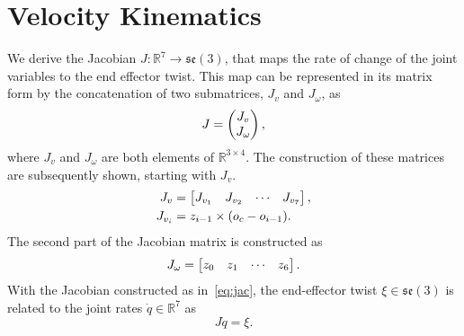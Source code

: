 \section{Velocity Kinematics}
\label{sec:vel}

We derive the Jacobian $J: \mathbb{R}^7 \rightarrow \mathfrak{se}(3)$, that
maps the rate of change of the joint variables to the end effector twist.
This map can be represented in its matrix form by the concatenation of two 
submatrices, $J_v$ and $J_\omega$, as 
\begin{equation} 
  J = \begin{pmatrix}J_v \\ J_\omega\end{pmatrix}, 
  \label{eq:jac}
\end{equation}
where $J_v$ and $J_\omega$ are both elements of $\mathbb{R}^{3 \times 4}$. 
The construction of these matrices are subsequently shown, starting with 
$J_v$.
%
\begin{align}
\begin{split}
  J_v &= \begin{bmatrix}J_{v_1} & J_{v_2} & \cdots & J_{v_7}\end{bmatrix}, \\
  J_{v_i} &= z_{i-1} \times (o_c - o_{i-1}).
  \label{eq:jac_v}
\end{split}
\end{align}
%
The second part of the Jacobian matrix is constructed as 
\begin{equation}
  J_\omega = \begin{bmatrix}z_0 & z_1 & \cdots & z_6\end{bmatrix}.
  \label{eq:jac_omega}
\end{equation}
%
With the Jacobian constructed as in~\eqref{eq:jac}, the end-effector 
twist $\xi \in \mathfrak{se}(3)$ is related to the joint rates 
$\dot{q} \in \mathbb{R}^7$ as \[ J \dot{q} = \xi. \]
